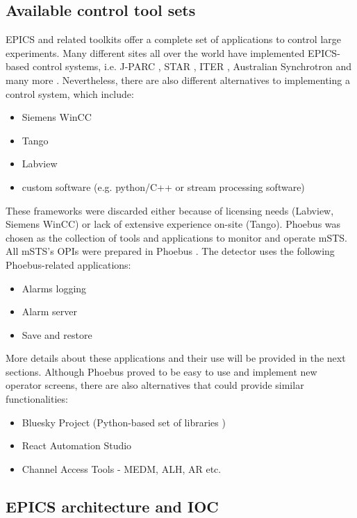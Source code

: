  \subsection{Available control tool sets}
 EPICS and related toolkits offer a complete set of applications to control large experiments. Many different sites all over the world have implemented EPICS-based control systems, i.e. \gls{J-PARC} \cite{J-PARC}, \gls{STAR} \cite{STAR}, \gls{ITER} \cite{ITER}, Australian Synchrotron and many more \cite{EPICS_site}.  Nevertheless, there are also different alternatives to implementing a control system, which include: 
 \begin{itemize}
     \item Siemens WinCC \cite{Camacho:2022fxa,Goralczyk:2022udx}
     \item Tango \cite{Santander-Vela:2021tma}
     \item Labview \cite{State:2022qlw} 
     \item custom software (e.g. python/C++ or stream processing software) \cite{taurus}
 \end{itemize} 
 These frameworks were discarded either because of licensing needs (Labview, Siemens WinCC) or lack of extensive experience on-site (Tango). Phoebus \cite{Phoebus} was chosen as the collection of tools and applications to monitor and operate \gls{mSTS}. All \gls{mSTS}'s \glspl{OPI} were prepared in Phoebus \cite{Phoebus}. The detector uses the following Phoebus-related applications:
\begin{itemize}
    \item Alarms logging
    \item Alarm server
    \item Save and restore
\end{itemize}
More details about these applications and their use will be provided in the next sections. Although Phoebus proved to be easy to use and implement new operator screens, there are also alternatives that could provide similar functionalities:
\begin{itemize}
    \item Bluesky Project (Python-based set of libraries \cite{Bluesky})
    \item React Automation Studio \cite{React}
    \item Channel Access Tools - MEDM, \gls{ALH}, \gls{AR} etc. 
\end{itemize}

\subsection{EPICS architecture and IOC}

